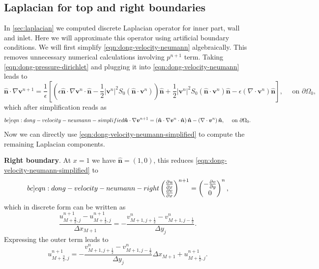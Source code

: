\documentclass{article}
\numberwithin{equation}{section}
\begin{document}
\subsection{Laplacian for top and right boundaries}
In \cref{sec:laplacian} we computed discrete Laplacian operator for inner part, wall and inlet. Here we will approximate this operator using artificial boundary conditions. We will first simplify \cref{eqn:dong-velocity-neumann} algebraically. This removes unnecessary numerical calculations involving $p^{n+1}$ term. Taking \cref{eqn:dong-pressure-dirichlet} and plugging it into \cref{eqn:dong-velocity-neumann} leads to
\begin{equation}
\boldsymbol{\hat{n}}\cdot \nabla \boldsymbol{v}^{n+1}=\frac{1}{\epsilon}\left[\left( \epsilon \boldsymbol{\hat{n}} \cdot \nabla \boldsymbol{v}^n \cdot \boldsymbol{\hat{n}}-\frac{1}{2}\left|\boldsymbol{v}^n\right|^2 S_0\left(\boldsymbol{\hat{n}} \cdot \boldsymbol{v}^n\right)\right) 
	\boldsymbol{\hat{n}}+\frac{1}{2}\left|\boldsymbol{v}^n\right|^2 S_0\left(\boldsymbol{\hat{n}} \cdot \boldsymbol{v}^n\right) \boldsymbol{\hat{n}}-\epsilon\left(\nabla \cdot \boldsymbol{v}^n\right) \boldsymbol{\hat{n}}\right], \quad \text { on } \partial \Omega_0,
\end{equation}
which after simplification reads as
\begin{equation}\label[bc]{eqn:dong-velocity-neumann-simplified}
\boldsymbol{\hat{n}}\cdot \nabla \boldsymbol{v}^{n+1}
=	
		\left( 
			\boldsymbol{\hat{n}} \cdot \nabla \boldsymbol{v}^n \cdot \boldsymbol{\hat{n}}
		\right) \boldsymbol{\hat{n}}
		-\left(\nabla \cdot \boldsymbol{v}^n\right) \boldsymbol{\hat{n}}, \quad \text { on } \partial \Omega_0.
\end{equation}
Now we can directly use \cref{eqn:dong-velocity-neumann-simplified} to compute the remaining Laplacian components.

\textbf{Right boundary}.
At $x=1$ we have $\boldsymbol{\hat{n}}=(1,0)$, this reduces \cref{eqn:dong-velocity-neumann-simplified} to
\begin{equation}\label[bc]{eqn:dong-velocity-neumann-right}
\begin{pmatrix}{}
	\frac{\partial{u}}{\partial x}\\
	\frac{\partial{v}}{\partial x}
\end{pmatrix}^{n+1}
=	
\begin{pmatrix}
	 -\frac{\partial v}{\partial y}\\
	0
\end{pmatrix}^n,
\end{equation}
which in discrete form can be written as 
\begin{equation}
	\frac{u_{M+\frac{3}{2},j}^{n+1}-u_{M+\frac{1}{2},j}^{n+1}}{\Delta x_{M+1}}=-\frac{v^n_{M+1,j+\frac{1}{2}}-v^n_{M+1,j-\frac{1}{2}}}{\Delta y_j}.
\end{equation}
Expressing the outer term leads to
\begin{equation}\label{eqn:u-ghost}
	u^{n+1}_{M+\frac{3}{2},j}=-\frac{v^n_{M+1,j+\frac{1}{2}}-v^n_{M+1,j-\frac{1}{2}}}{\Delta y_j}\Delta x_{M+1}+u^{n+1}_{M+\frac{1}{2},j}.
\end{equation}
\end{document}
